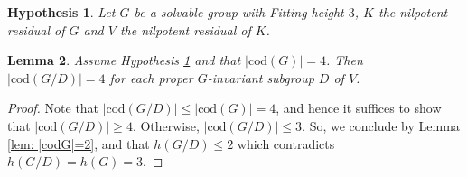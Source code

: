 \documentclass[9pt]{article}
\newtheorem{lem}{\bf Lemma}[section]
\newtheorem{hy}[lem]{\bf Hypothesis}
\begin{document}
\begin{hy}\label{hy: height=3}
	Let $G$ be a solvable group with Fitting height $3$, $K$ the nilpotent residual of $G$ and 
	$V$ the nilpotent residual of $K$.
\end{hy}






\begin{lem}\label{lem: height=3, induction}
	Assume Hypothesis \ref{hy: height=3} and that $|\mathrm{cod}(G)|=4$.
	Then $|\mathrm{cod}(G/D)|=4$ for each proper $G$-invariant subgroup $D$ of $V$.
\end{lem}
\begin{proof}
	Note that $|\mathrm{cod}(G/D)|\leq |\mathrm{cod}(G)|=4$, and hence it suffices to show that $|\mathrm{cod}(G/D)|\geq 4$.
	Otherwise, $|\mathrm{cod}(G/D)|\leq 3$.
	So, we conclude by Lemma \ref{lem: |codG|=2}, \cite[Theorem 3.4]{alizadeh2019} and \cite[Theorem 0.1]{alizadeh2022} that $h(G/D)\leq 2$ which contradicts $h(G/D)=h(G)=3$.
\end{proof}
\end{document}
